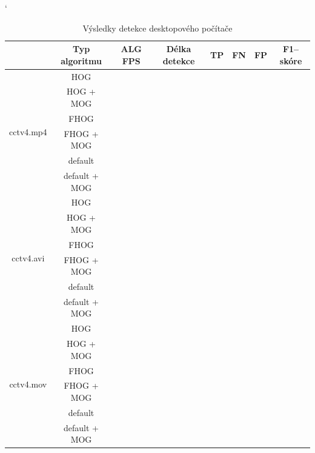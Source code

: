 \begin{table}[H]
\catcode`
\centering
\caption{Výsledky detekce desktopového počítače}
\label{resultTabDesktop}
\begin{tabular}{|c|c|c|c|c|c|c|c|}
\hline
                         & Typ algoritmu   & ALG FPS & Délka detekce & TP & FN & FP & F1--skóre \\ \hline
\multirow{6}{*}{cctv4.mp4} & HOG        &         &               &    &    &    &          \\ \cline{2-8} 
                         & HOG + MOG  &         &               &    &    &    &          \\ \cline{2-8} 
                         & FHOG       &         &               &    &    &    &          \\ \cline{2-8} 
                         & FHOG + MOG &         &               &    &    &    &          \\ \cline{2-8}  
                         & default	 &         &               &    &    &    &          \\ \cline{2-8} 
                         & default + MOG &         &               &    &    &    &          \\ \hline\hline 
\multirow{6}{*}{cctv4.avi} & HOG        &         &               &    &    &    &          \\ \cline{2-8} 
                         & HOG + MOG  &         &               &    &    &    &          \\ \cline{2-8} 
                         & FHOG       &         &               &    &    &    &          \\ \cline{2-8} 
                         & FHOG + MOG &         &               &    &    &    &          \\ \cline{2-8} 
                         & default  &         &               &    &    &    &          \\ \cline{2-8} 
                         & default + MOG &         &               &    &    &    &          \\ \hline \hline
\multirow{6}{*}{cctv4.mov} & HOG        &         &               &    &    &    &          \\ \cline{2-8} 
                         & HOG + MOG  &         &               &    &    &    &          \\ \cline{2-8} 
                         & FHOG       &         &               &    &    &    &          \\ \cline{2-8} 
                         & FHOG + MOG &         &               &    &    &    &          \\ \cline{2-8} 
                         & default  &         &               &    &    &    &          \\ \cline{2-8} 
                         & default + MOG &         &               &    &    &    &          \\ \hline
\end{tabular}
\end{table}

